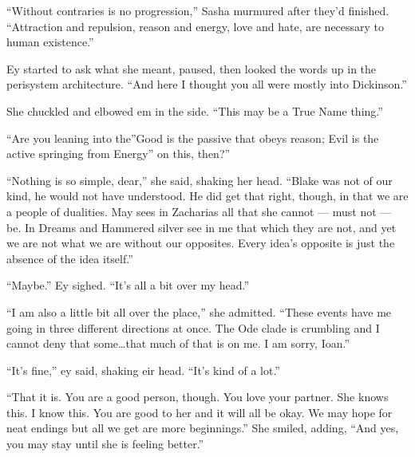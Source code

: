 ``Without contraries is no progression,'' Sasha murmured after they'd finished. ``Attraction and repulsion, reason and energy, love and hate, are necessary to human existence.''

Ey started to ask what she meant, paused, then looked the words up in the perisystem architecture. ``And here I thought you all were mostly into Dickinson.''

She chuckled and elbowed em in the side. ``This may be a True Name thing.''

``Are you leaning into the''Good is the passive that obeys reason; Evil is the active springing from Energy'' on this, then?''

``Nothing is so simple, dear,'' she said, shaking her head. ``Blake was not of our kind, he would not have understood. He did get that right, though, in that we are a people of dualities. May sees in Zacharias all that she cannot — must not — be. In Dreams and Hammered silver see in me that which they are not, and yet we are not what we are without our opposites. Every idea's opposite is just the absence of the idea itself.''

``Maybe.'' Ey sighed. ``It's all a bit over my head.''

``I am also a little bit all over the place,'' she admitted. ``These events have me going in three different directions at once. The Ode clade is crumbling and I cannot deny that some\ldots that much of that is on me. I am sorry, Ioan.''

``It's fine,'' ey said, shaking eir head. ``It's kind of a lot.''

``That it is. You are a good person, though. You love your partner. She knows this. I know this. You are good to her and it will all be okay. We may hope for neat endings but all we get are more beginnings.'' She smiled, adding, ``And yes, you may stay until she is feeling better.''
